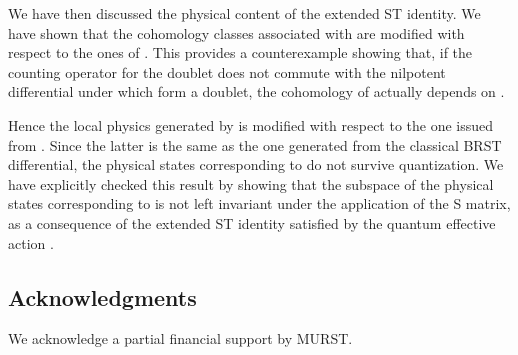 \documentclass[a4paper,11pt]{article}
\def\G{\Gamma}
\begin{document}
We have then discussed the physical content of the extended ST identity.
We have shown that the cohomology classes associated with \coordHE{} are modified
with respect to the ones of \coordHE{}. 
This provides a counterexample showing
that, if the counting operator for the doublet \coordHE{} does not commute with the nilpotent differential
\myHighlight{$\delta$}\coordHE{} under which \coordHE{} form a doublet, the cohomology of \myHighlight{$\delta$}\coordHE{} actually depends on \coordHE{}.

Hence the local physics generated by \coordHE{} is modified with respect
to the one issued from \coordHE{}. Since the latter is the same as the one generated from the
classical BRST differential, the physical states corresponding to \coordHE{}  do not survive quantization.
We have explicitly checked this result by showing that the subspace of the physical states
corresponding to \coordHE{} is not left invariant under the application of the S matrix,
as a consequence of the extended ST identity satisfied by the quantum effective action \myHighlight{$\G$}\coordHE{}.

\subsection*{Acknowledgments}
We acknowledge a partial financial support by MURST.
%
\end{document}
